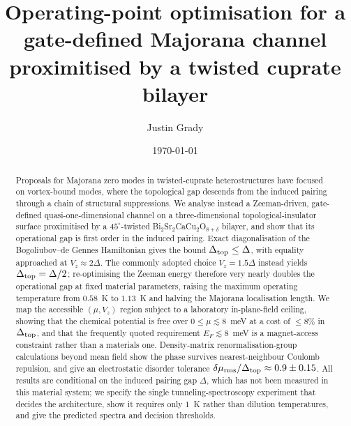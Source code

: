 \documentclass[aps,prb,twocolumn,superscriptaddress,floatfix,nofootinbib]{revtex4-2}
\newcommand{\dtop}{\Delta_{\rm top}}
\newcommand{\vz}{V_z}
\begin{document}
\title{Operating-point optimisation for a gate-defined Majorana channel
proximitised by a twisted cuprate bilayer}

\author{Justin Grady}
\email{[contact]}

\date{\today}

\begin{abstract}
Proposals for Majorana zero modes in twisted-cuprate heterostructures have
focused on vortex-bound modes, where the topological gap descends from the
induced pairing through a chain of structural suppressions. We analyse instead
a Zeeman-driven, gate-defined quasi-one-dimensional channel on a
three-dimensional topological-insulator surface proximitised by a
$45^\circ$-twisted Bi$_2$Sr$_2$CaCu$_2$O$_{8+\delta}$ bilayer, and show that
its operational gap is first order in the induced pairing. Exact
diagonalisation of the Bogoliubov--de Gennes Hamiltonian gives the bound
$\dtop \le \Delta$, with equality approached at $\vz \approx 2\Delta$. The
commonly adopted choice $\vz = 1.5\Delta$ instead yields $\dtop = \Delta/2$;
re-optimising the Zeeman energy therefore very nearly doubles the operational
gap at fixed material parameters, raising the maximum operating temperature
from $0.58$~K to $1.13$~K and halving the Majorana localisation length. We map
the accessible $(\mu, \vz)$ region subject to a laboratory in-plane-field
ceiling, showing that the chemical potential is free over
$0 \le \mu \lesssim 8$~meV at a cost of $\le 8\%$ in $\dtop$, and that the
frequently quoted requirement $E_F \lesssim 8$~meV is a magnet-access
constraint rather than a materials one. Density-matrix renormalisation-group
calculations beyond mean field show the phase survives nearest-neighbour
Coulomb repulsion, and give an electrostatic disorder tolerance
$\delta\mu_{\rm rms}/\dtop \approx 0.9 \pm 0.15$. All results are conditional
on the induced pairing gap $\Delta$, which has not been measured in this
material system; we specify the single tunneling-spectroscopy experiment that
decides the architecture, show it requires only $1$~K rather than dilution
temperatures, and give the predicted spectra and decision thresholds.
\end{abstract}

\maketitle

\end{document}
